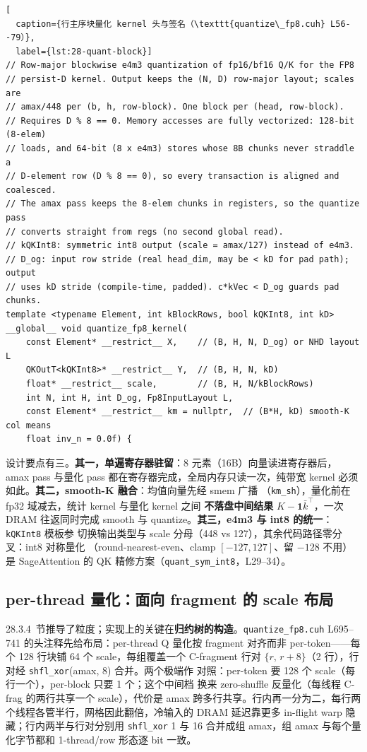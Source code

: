 \begin{lstlisting}[
  caption={行主序块量化 kernel 头与签名（\texttt{quantize\_fp8.cuh} L56--79）},
  label={lst:28-quant-block}]
// Row-major blockwise e4m3 quantization of fp16/bf16 Q/K for the FP8
// persist-D kernel. Output keeps the (N, D) row-major layout; scales are
// amax/448 per (b, h, row-block). One block per (head, row-block).
// Requires D % 8 == 0. Memory accesses are fully vectorized: 128-bit (8-elem)
// loads, and 64-bit (8 x e4m3) stores whose 8B chunks never straddle a
// D-element row (D % 8 == 0), so every transaction is aligned and coalesced.
// The amax pass keeps the 8-elem chunks in registers, so the quantize pass
// converts straight from regs (no second global read).
// kQKInt8: symmetric int8 output (scale = amax/127) instead of e4m3.
// D_og: input row stride (real head_dim, may be < kD for pad path); output
// uses kD stride (compile-time, padded). c*kVec < D_og guards pad chunks.
template <typename Element, int kBlockRows, bool kQKInt8, int kD>
__global__ void quantize_fp8_kernel(
    const Element* __restrict__ X,    // (B, H, N, D_og) or NHD layout L
    QKOutT<kQKInt8>* __restrict__ Y,  // (B, H, N, kD)
    float* __restrict__ scale,        // (B, H, N/kBlockRows)
    int N, int H, int D_og, Fp8InputLayout L,
    const Element* __restrict__ km = nullptr,  // (B*H, kD) smooth-K col means
    float inv_n = 0.0f) {
\end{lstlisting}

设计要点有三。\textbf{其一，单遍寄存器驻留}：8 元素（16B）向量读进寄存器后，
amax pass 与量化 pass 都在寄存器完成，全局内存只读一次，纯带宽 kernel 必须如此。\textbf{其二，smooth-K 融合}：均值向量先经 smem 广播
（\texttt{km\_sh}），量化前在 fp32 域减去，统计 kernel 与量化 kernel 之间
\textbf{不落盘中间结果} $K - \mathbf{1}\bar k^{\top}$，一次 DRAM 往返同时完成
smooth 与 quantize。\textbf{其三，e4m3 与 int8 的统一}：\texttt{kQKInt8} 模板参
切换输出类型与 scale 分母（448 vs 127），其余代码路径零分叉：int8 对称量化
（round-nearest-even、clamp $[-127,127]$、留 $-128$ 不用）是 SageAttention 的
QK 精修方案（\texttt{quant\_sym\_int8}，L29--34）。

\subsection{per-thread 量化：面向 fragment 的 scale 布局}\label{sec:28-quant-perthread}

28.3.4~节推导了粒度；实现上的关键在\textbf{归约树的构造}。\texttt{quantize\_fp8.cuh}
L695--741 的头注释先给布局：per-thread Q 量化按 fragment 对齐而非
per-token——每个 128 行块铺 64 个 scale，每组覆盖一个 C-fragment 行对
$\{r,\,r{+}8\}$（2 行），行对经 \texttt{shfl\_xor}(amax, 8) 合并。两个极端作
对照：per-token 要 128 个 scale（每行一个），per-block 只要 1 个；这个中间档
换来 zero-shuffle 反量化（每线程 C-frag 的两行共享一个 scale），代价是 amax
跨多行共享。行内再一分为二，每行两个线程各管半行，网格因此翻倍，冷输入的
DRAM 延迟靠更多 in-flight warp 隐藏；行内两半与行对分别用 \texttt{shfl\_xor}
1 与 16 合并成组 amax，组 amax 与每个量化字节都和 1-thread/row 形态逐 bit
一致。

